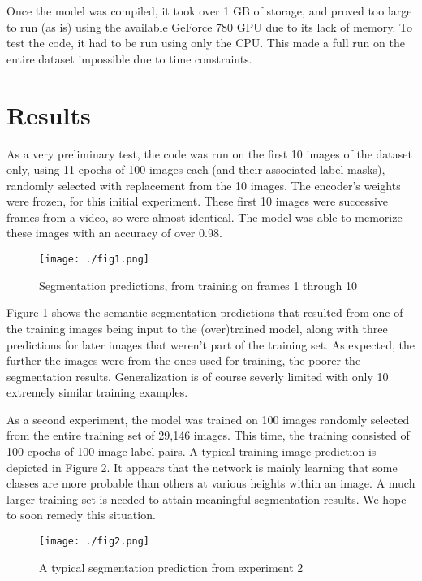 \smallskip
Once the model was compiled, it took over 1 GB of storage, and proved too large to run
(as is) using the available GeForce 780 GPU due to its lack of memory. To test the code, it 
had to be run using only the CPU. This made a full run on the entire dataset impossible due
to time constraints. 
 
 
\section{Results}

As a very preliminary test, the code was run on the first 10 images of the dataset only, using
11 epochs of 100 images each (and their associated label masks), randomly selected with replacement from 
the 10 images. The encoder's weights were frozen, for this initial experiment. These first
10 images were successive frames from a video, so were almost identical. The model was able
to memorize these images with an accuracy of over 0.98. 


\begin{figure}[h]
 \centering
 \texttt{[image: ./fig1.png]}
 \caption{Segmentation predictions, from training on frames 1 through 10}
 \label{fig:1}
\end{figure}





Figure 1 shows the semantic 
segmentation predictions that resulted from one of the training images being input
to the (over)trained model, along with three predictions for later images that weren't 
part of the training set. As expected, the further the images were from the ones used 
for training, the poorer the segmentation results. Generalization is of course severly limited with 
only 10 extremely similar training examples.


As a second experiment, the model was trained on 100 images randomly selected from the entire training
set of 29,146 images. This time, the training consisted of 100 epochs of 100 image-label pairs. A typical
training image prediction is depicted in Figure 2. It appears that the network is mainly learning that 
some classes are more probable than others at various heights within an image. A much larger training 
set is needed to attain meaningful segmentation results. We hope to soon remedy this situation.


\begin{figure}[h]
 \centering
 \texttt{[image: ./fig2.png]}
 \caption{A typical segmentation prediction from experiment 2}
 \label{fig:2}
\end{figure}





